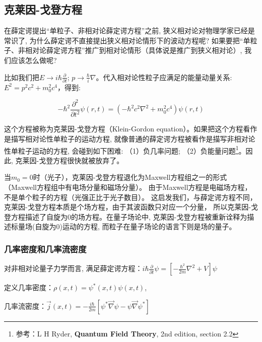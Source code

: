 \subsection{克莱因-戈登方程}

在薛定谔提出``单粒子、非相对论薛定谔方程''之前,
狭义相对论对物理学家已经是常识了,
为什么薛定谔不直接提出狭义相对论情形下的波动方程呢?
如果要把``单粒子、非相对论薛定谔方程''推广到相对论情形（具体说是推广到狭义相对论）,
我们应该怎么做呢?

比如我们把$E \to i \hbar \frac{\partial}{\partial t}$; $p \to
\frac{\hbar}{i} \nabla$。代入相对论性粒子应满足的能量动量关系: $E^2
= p^2 c^2 + m_0^2 c^4 $，得到:

\begin{center}
\begin{equation}\label{Klein Gordon eq}
    - \hbar ^2 \frac{{\partial ^2 }}{{\partial t^2 }}\psi (r,t) = \left( { - \hbar ^2 c^2 \nabla ^2  + m_0 ^2 c^4 } \right)\psi (r,t)
\end{equation}
\end{center}


这个方程被称为克莱因-戈登方程（Klein-Gordon
equation）。如果把这个方程看作是描写相对论性单粒子的运动方程,
就像普通的薛定谔方程被看作是描写非相对论性单粒子运动的方程,
会碰到如下困难: （1）负几率问题; （2）负能量问题\footnote{参考：L H
Ryder, \textbf{Quantum Field Theory}, 2nd edition, section
2.2}。因此, 克莱因-戈登方程很快就被放弃了。

当$m_0  =
0$时（光子），克莱因-戈登方程退化为Maxwell方程组之一的形式（Maxwell方程组中有电场分量和磁场分量）。
由于Maxwell方程是电磁场方程，不是单个粒子的方程（光强正比于光子数目）。
这启发我们，与薛定谔方程不同，克莱因-戈登方程本质是个场方程，由于其波函数只对应一个分量，
所以克莱因-戈登方程描述了自旋为$0$的场方程。在量子场论中,
克莱因-戈登方程被重新诠释为描述标量场(自旋为$0$)运动的方程,
而粒子在量子场论的语言下则是场的量子。


\subsubsection{几率密度和几率流密度}

对非相对论量子力学而言, 满足薛定谔方程：$i\hbar \frac{\partial
}{\partial t} \psi = [ - \frac{\hbar^2}{2m} \nabla^2 + V]\psi$


定义几率密度：$\rho (x,t) = \psi^*(x,t) \psi(x,t)$,


几率流密度：$\vec{j}(x,t) = - \frac{i \hbar}{2m}[\psi^* \vec{\nabla}
\psi - \psi \vec{\nabla} \psi^*]$

